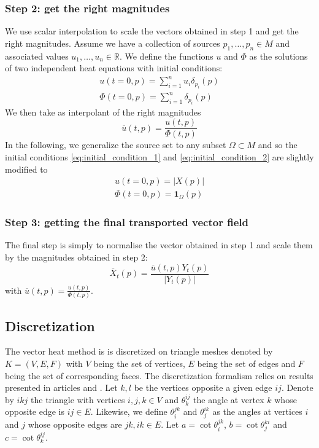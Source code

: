 \documentclass[sigconf]{acmart}
\begin{document}
\subsubsection{Step 2: get the right magnitudes}
We use scalar interpolation to scale the vectors obtained in step 1 and get the right magnitudes. Assume we have a collection of sources
$p_1, \dots, p_n \in M$ and associated values $u_1, \dots, u_n \in \mathbb{R}$. We define the functions $u$ and $\Phi$ 
as the solutions of two independent heat equations with initial conditions:
\begin{align}
  u(t = 0, p) = \sum_{i = 1}^nu_i\delta_{p_i}(p) \label{eq:initial_condition_1}\\
  \Phi(t = 0, p) = \sum_{i=1}^n\delta_{p_i}(p) \label{eq:initial_condition_2}
\end{align}
We then take as interpolant of the right magnitudes 
\begin{equation}
  \overline{u}(t,p) = \frac{u(t,p)}{\Phi(t,p)}
\end{equation}
In the following, we generalize the source set to any subset $\Omega \subset M$
and so the initial conditions \ref{eq:initial_condition_1} and \ref{eq:initial_condition_2}
are slightly modified to 
\begin{align*}
  u(t=0, p) = | X(p) | \\
  \Phi(t=0, p) = \mathbf{1}_{\Omega}(p)
\end{align*}

\subsubsection{Step 3: getting the final transported vector field}
The final step is simply to normalise the vector obtained in step 1 and scale them by the magnitudes obtained in step 2: 
$$\overline{X}_t(p) = \frac{\overline{u}(t,p)Y_t(p)}{|Y_t(p)|}$$ with $\overline{u}(t,p) = \frac{u(t,p)}{\Phi(t, p)}$.

\subsection{Discretization}
The vector heat method is is discretized on triangle meshes denoted by $K = (V, E, F)$
with $V$ being the set of vertices, $E$ being the set of edges and $F$ 
being the set of corresponding faces. The discretization formalism relies 
on results presented in articles \cite{10.1145/2461912.2462005} and \cite{Knoppel:2015:SPS}. Let $k,l$ be the vertices opposite 
a given edge $ij$. Denote by $ikj$ the triangle with vertices $i, j, k \in V$ and $\theta_k^{ij}$ the angle at 
vertex $k$ whose opposite edge is $ij\in E$. Likewise, we define $\theta_i^{jk}$ 
and $\theta_j^{ik}$ as the angles at vertices $i$ and $j$ whose opposite edges are $jk, ik \in E$. 
Let $a = \cot \theta_i^{jk}$, $b = \cot \theta_j^{ki}$ and $c = \cot \theta_k^{ij}$. 
\end{document}
